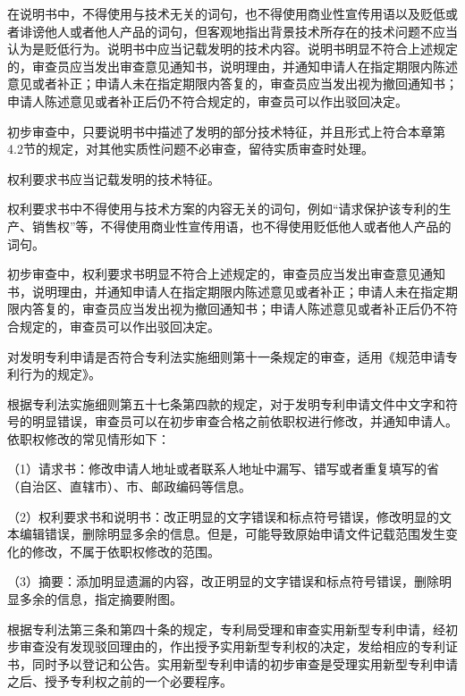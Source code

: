 在说明书中，不得使用与技术无关的词句，也不得使用商业性宣传用语以及贬低或者诽谤他人或者他人产品的词句，但客观地指出背景技术所存在的技术问题不应当认为是贬低行为。说明书中应当记载发明的技术内容。说明书明显不符合上述规定的，审查员应当发出审查意见通知书，说明理由，并通知申请人在指定期限内陈述意见或者补正；申请人未在指定期限内答复的，审查员应当发出视为撤回通知书；申请人陈述意见或者补正后仍不符合规定的，审查员可以作出驳回决定。

初步审查中，只要说明书中描述了发明的部分技术特征，并且形式上符合本章第4.2节的规定，对其他实质性问题不必审查，留待实质审查时处理。

权利要求书应当记载发明的技术特征。

权利要求书中不得使用与技术方案的内容无关的词句，例如“请求保护该专利的生产、销售权”等，不得使用商业性宣传用语，也不得使用贬低他人或者他人产品的词句。

初步审查中，权利要求书明显不符合上述规定的，审查员应当发出审查意见通知书，说明理由，并通知申请人在指定期限内陈述意见或者补正；申请人未在指定期限内答复的，审查员应当发出视为撤回通知书；申请人陈述意见或者补正后仍不符合规定的，审查员可以作出驳回决定。

对发明专利申请是否符合专利法实施细则第十一条规定的审查，适用《规范申请专利行为的规定》。

根据专利法实施细则第五十七条第四款的规定，对于发明专利申请文件中文字和符号的明显错误，审查员可以在初步审查合格之前依职权进行修改，并通知申请人。依职权修改的常见情形如下：

{\setlength{\parindent}{17.1bp}（1）请求书：修改申请人地址或者联系人地址中漏写、错写或者重复填写的省（自治区、直辖市）、市、邮政编码等信息。\par}

{\setlength{\parindent}{17.1bp}（2）权利要求书和说明书：改正明显的文字错误和标点符号错误，修改明显的文本编辑错误，删除明显多余的信息。但是，可能导致原始申请文件记载范围发生变化的修改，不属于依职权修改的范围。\par}

{\setlength{\parindent}{17.1bp}（3）摘要：添加明显遗漏的内容，改正明显的文字错误和标点符号错误，删除明显多余的信息，指定摘要附图。\par}

根据专利法第三条和第四十条的规定，专利局受理和审查实用新型专利申请，经初步审查没有发现驳回理由的，作出授予实用新型专利权的决定，发给相应的专利证书，同时予以登记和公告。实用新型专利申请的初步审查是受理实用新型专利申请之后、授予专利权之前的一个必要程序。

